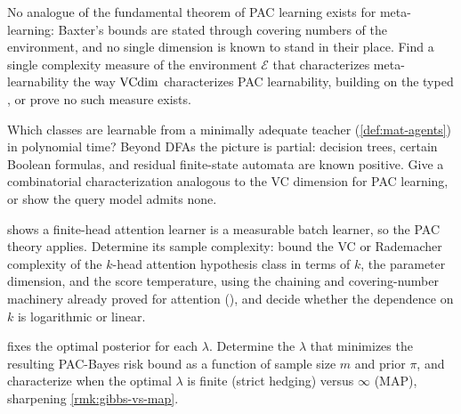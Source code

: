 \begin{openprob}
\label{op:meta-char}
No analogue of the fundamental theorem of PAC learning exists for meta-learning: Baxter's bounds are stated through covering numbers of the environment, and no single dimension is known to stand in their place. Find a single complexity measure of the environment $\mathcal{E}$ that characterizes meta-learnability the way $\mathrm{VCdim}$ characterizes PAC learnability, building on the typed , or prove no such measure exists.
\end{openprob}

\begin{openprob}
\label{op:mat-char}
Which classes are learnable from a minimally adequate teacher (\cref{def:mat-agents}) in polynomial time? Beyond DFAs the picture is partial: decision trees, certain Boolean formulas, and residual finite-state automata are known positive. Give a combinatorial characterization analogous to the VC dimension for PAC learning, or show the query model admits none.
\end{openprob}

\begin{openprob}
\label{op:attention-capacity}
 shows a finite-head attention learner is a measurable batch learner, so the PAC theory applies. Determine its sample complexity: bound the VC or Rademacher complexity of the $k$-head attention hypothesis class in terms of $k$, the parameter dimension, and the score temperature, using the chaining and covering-number machinery already proved for attention (), and decide whether the dependence on $k$ is logarithmic or linear.
\end{openprob}

\begin{openprob}
\label{op:gibbs-temperature}
 fixes the optimal posterior for each $\lambda$. Determine the $\lambda$ that minimizes the resulting PAC-Bayes risk bound as a function of sample size $m$ and prior $\pi$, and characterize when the optimal $\lambda$ is finite (strict hedging) versus $\infty$ (MAP), sharpening \cref{rmk:gibbs-vs-map}.
\end{openprob}

